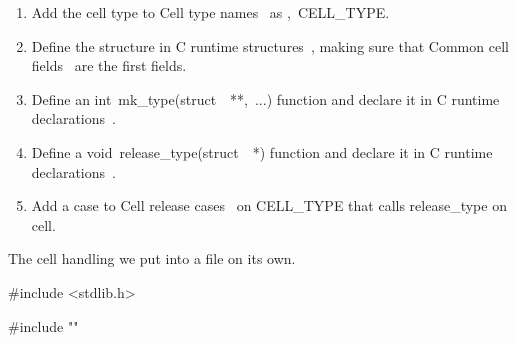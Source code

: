 \documentclass{article}%
\begin{document}
\begin{enumerate}
        \item Add the cell type to {\Tt{}\LA{}Cell type names~{\nwtagstyle{}}\RA{}\nwendquote}
                as {\Tt{},\ CELL{\_}TYPE\nwendquote}.
        \item Define the structure in {\Tt{}\LA{}C runtime structures~{\nwtagstyle{}}\RA{}\nwendquote},
                making sure that {\Tt{}\LA{}Common cell fields~{\nwtagstyle{}}\RA{}\nwendquote}
                are the first fields.
        \item Define an {\Tt{}int\ mk{\_}type(struct\ \ **,\ ...)\nwendquote}
                function and declare it in
                {\Tt{}\LA{}C runtime declarations~{\nwtagstyle{}}\RA{}\nwendquote}.
        \item Define a {\Tt{}void\ release{\_}type(struct\ \ *)\nwendquote}
                function and declare it in 
                {\Tt{}\LA{}C runtime declarations~{\nwtagstyle{}}\RA{}\nwendquote}.
        \item Add a case to {\Tt{}\LA{}Cell release cases~{\nwtagstyle{}}\RA{}\nwendquote} 
                on {\Tt{}CELL{\_}TYPE\nwendquote} that calls {\Tt{}release{\_}type\nwendquote} on
                {\Tt{}cell\nwendquote}.
\end{enumerate}

The cell handling we put into a file on its own.

\nwenddocs{}\endmoddef\nwstartdeflinemarkup\nwenddeflinemarkup
#include <stdlib.h>

#include ""
\end{document}
